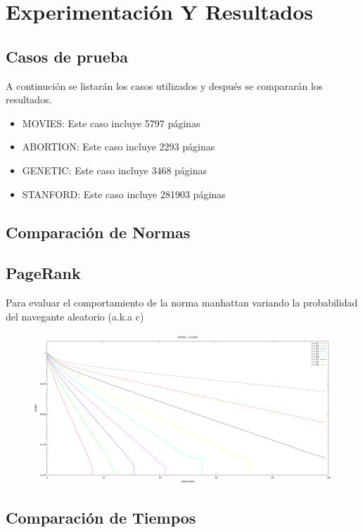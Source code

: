 \section{Experimentación Y Resultados}

\subsection{Casos de prueba}
   A continución se listarán los casos utilizados y después se compararán los resultados.

	\begin{itemize}
		\item MOVIES: Este caso incluye 5797 páginas
		\item ABORTION: Este caso incluye 2293 páginas
		\item GENETIC: Este caso incluye 3468 páginas
		\item STANFORD: Este caso incluye 281903 páginas
	\end{itemize}   

\subsection{Comparación de Normas}

\subsection {PageRank}

Para evaluar el comportamiento de la norma manhattan variando la probabilidad del navegante aleatorio (a.k.a c)

\begin{figure}[h!]
   \centering
    \includegraphics[width=1\textwidth]{imagenes/pagerank_norma.png}
\end{figure}


\subsection{Comparación de Tiempos}
 
